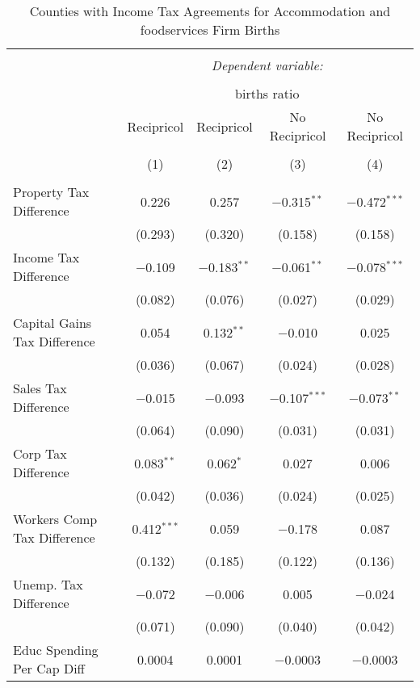 
\begin{table}[!htbp] \centering 
  \caption{Counties with Income Tax Agreements for  Accommodation and foodservices Firm Births} 
  \label{72rd} 
\begin{tabular}{@{\extracolsep{5pt}}lcccc} 
\\[-1.8ex]\hline 
\hline \\[-1.8ex] 
 & \multicolumn{4}{c}{\textit{Dependent variable:}} \\ 
\cline{2-5} 
\\[-1.8ex] & \multicolumn{4}{c}{births ratio} \\ 
 & Recipricol & Recipricol & No Recipricol & No Recipricol \\ 
\\[-1.8ex] & (1) & (2) & (3) & (4)\\ 
\hline \\[-1.8ex] 
 Property Tax Difference & 0.226 & 0.257 & $-$0.315$^{**}$ & $-$0.472$^{***}$ \\ 
  & (0.293) & (0.320) & (0.158) & (0.158) \\ 
  Income Tax Difference & $-$0.109 & $-$0.183$^{**}$ & $-$0.061$^{**}$ & $-$0.078$^{***}$ \\ 
  & (0.082) & (0.076) & (0.027) & (0.029) \\ 
  Capital Gains Tax Difference & 0.054 & 0.132$^{**}$ & $-$0.010 & 0.025 \\ 
  & (0.036) & (0.067) & (0.024) & (0.028) \\ 
  Sales Tax Difference & $-$0.015 & $-$0.093 & $-$0.107$^{***}$ & $-$0.073$^{**}$ \\ 
  & (0.064) & (0.090) & (0.031) & (0.031) \\ 
  Corp Tax Difference & 0.083$^{**}$ & 0.062$^{*}$ & 0.027 & 0.006 \\ 
  & (0.042) & (0.036) & (0.024) & (0.025) \\ 
  Workers Comp Tax Difference & 0.412$^{***}$ & 0.059 & $-$0.178 & 0.087 \\ 
  & (0.132) & (0.185) & (0.122) & (0.136) \\ 
  Unemp. Tax Difference & $-$0.072 & $-$0.006 & 0.005 & $-$0.024 \\ 
  & (0.071) & (0.090) & (0.040) & (0.042) \\ 
  Educ Spending Per Cap Diff & 0.0004 & 0.0001 & $-$0.0003 & $-$0.0003 \\ 

\end{tabular}
\end{table}
